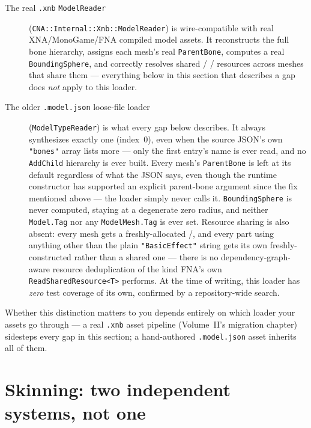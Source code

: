\begin{description}
  \item[The real \texttt{.xnb} \texttt{ModelReader}] (\texttt{CNA::Internal::Xnb::ModelReader})
        is wire-compatible with real XNA/MonoGame/FNA compiled model assets. It reconstructs
        the full bone hierarchy, assigns each mesh's real \texttt{ParentBone}, computes a real
        \texttt{BoundingSphere}, and correctly resolves shared /%
        / resources across meshes that share them ---
        everything below in this section that describes a gap does \emph{not} apply to this
        loader.
  \item[The older \texttt{.model.json} loose-file loader] (\texttt{ModelTypeReader}) is what
        every gap below describes. It always synthesizes exactly one 
        (index~0), even when the source JSON's own \texttt{"bones"} array lists more --- only
        the first entry's name is ever read, and no \texttt{AddChild} hierarchy is ever built.
        Every mesh's \texttt{ParentBone} is left at its default regardless of what the JSON
        says, even though the runtime constructor has supported an explicit parent-bone
        argument since the fix mentioned above --- the loader simply never calls it.
        \texttt{BoundingSphere} is never computed, staying at a degenerate zero radius, and
        neither \texttt{Model.Tag} nor any \texttt{ModelMesh.Tag} is ever set. Resource
        sharing is also absent: every mesh gets a freshly-allocated
        /, and every part using anything other
        than the plain \texttt{"BasicEffect"} string gets its own freshly-constructed
         rather than a shared one --- there is no dependency-graph-aware
        resource deduplication of the kind FNA's own \texttt{ReadSharedResource<T>}
        performs. At the time of writing, this loader has \emph{zero} test coverage of its
        own, confirmed by a repository-wide search.
\end{description}

Whether this distinction matters to you depends entirely on which loader your assets go
through --- a real \texttt{.xnb} asset pipeline (Volume~II's migration chapter) sidesteps
every gap in this section; a hand-authored \texttt{.model.json} asset inherits all of them.

\section{Skinning: two independent systems, not one}

